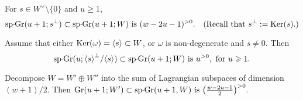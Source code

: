 \documentclass[11pt,reqno]{amsart}
\let\nit\noindent
\let\lan\langle
\let\ran\rangle
\numberwithin{equation}{section}
\numberwithin{figure}{section}
\let\sm\setminus
\let\ges\geqslant
\begin{document}
\begin{m-lemma}\label{lm:sp-p-pos}
\nit{\rm(i)} 
For $s\in W^\vee\sm\{0\}$ and $u\ges 1$, 
$$
{{\rm sp{{{\vrule height2.75pt depth-2.35pt width2.3pt \kern1.7pt}}\!}Gr}}(u+1;s^\perp)\subset{{\rm sp{{{\vrule height2.75pt depth-2.35pt width2.3pt \kern1.7pt}}\!}Gr}}(u+1;W)
\text{ is }(w-2u-1)^{{>0}}.\quad(\text{Recall that $s^\perp:={{\rm Ker}}(s)$.})
$$

\nit{\rm(ii)} 
Assume that either ${{\rm Ker}}(\omega)={{\lan {s}\ran}}\subset W$, 
or $\omega$ is non-degenerate and $s\neq0$. Then 
$$
{{\rm sp{{{\vrule height2.75pt depth-2.35pt width2.3pt \kern1.7pt}}\!}Gr}}(u;{{\lan {s}\ran}}^\perp/{{\lan {s}\ran}})\subset{{\rm sp{{{\vrule height2.75pt depth-2.35pt width2.3pt \kern1.7pt}}\!}Gr}}(u+1;W)
\text{ is }{u}^{{>0}},\text{ for }u\ges 1.
$$

\nit{\rm(iii)} Decompose $W=W'\oplus W''$ into the sum of Lagrangian subspaces 
of dimension $(w+1)/2$. Then 
$
{{\rm Gr}}(u+1;W')\subset{{\rm sp{{{\vrule height2.75pt depth-2.35pt width2.3pt \kern1.7pt}}\!}Gr}}(u+1,W)\text{ is }\big(\frac{w-2u-1}{2}\big)^{{>0}}.
$ 
\end{m-lemma}
\end{document}

